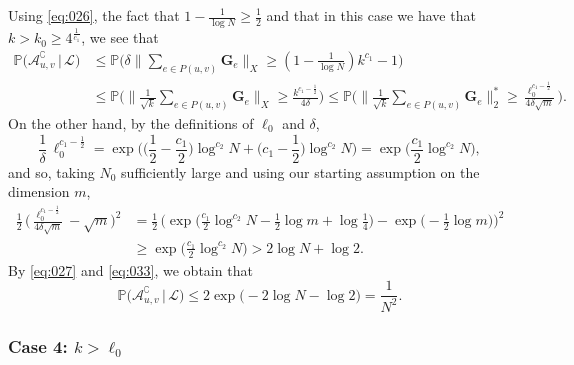 \documentclass[11pt,leqno]{amsart}
\theoremstyle{remark}
\theoremstyle{plain}
\begin{document}
Using \eqref{eq:026}, the fact that $1-\frac{1}{\log N}\geqslant\frac{1}{2}$ and that in this case we have that
$k>k_0\geqslant 4^{\frac{1}{c_1}}$, we see that
\begin{align} \label{eq:033}
\mathbb{P}\big(\mathcal{A}_{u,v}^{\complement}\,\big|\,\mathcal{L}\big) & \leqslant
\mathbb{P}\Bigg(\delta\Big\|\sum_{e\in P(u, v)} \mathbf{G}_e\Big\|_X\geqslant
\left(1-\frac{1}{\log N}\right)k^{c_1}-1\Bigg) \\
& \leqslant \mathbb{P}\Bigg( \Big\|\frac{1}{\sqrt{k}}\sum_{e\in P(u, v)} \mathbf{G}_e\Big\|_X \geqslant
\frac{k^{c_1-\frac{1}{2}}}{4\delta}\Bigg) \leqslant
\mathbb{P}\Bigg( \Big\|\frac{1}{\sqrt{k}}\sum_{e\in P(u, v)} \mathbf{G}_e\Big\|_2^*\geqslant
\frac{\ell_0^{c_1-\frac{1}{2}}}{4\delta\sqrt{m}}\Bigg). \nonumber
\end{align}
On the other hand, by the definitions of $\ell_0$ and $\delta$,
\[  \frac{1}{\delta}\, \ell_0^{c_1-\frac12} =
\exp\Big(\Big(\frac12-\frac{c_1}{2}\Big)\log^{c_2}N +
\Big(c_1-\frac12\Big)\log^{c_2}N\Big)=\exp\Big(\frac{c_1}{2}\log^{c_2}N\Big), \]
and so, taking $N_0$ sufficiently large and using our starting assumption on the dimension $m$,
\begin{align*}
\frac12\, \Big( \frac{\ell_0^{c_1-\frac{1}{2}}}{4\delta\sqrt{m}} - \sqrt{m}\Big)^2
& = \frac12\, \Big( \exp\Big(\frac{c_1}{2}\log^{c_2}N- \frac12\log m +
\log\frac14\Big)- \exp\Big( -\frac12\log m\Big) \Big)^2 \\
&\geqslant \exp\Big( \frac{c_1}{2}\log^{c_2}N\Big) >2\log N+\log2.
\end{align*}
By \eqref{eq:027} and \eqref{eq:033}, we obtain that
\[ \mathbb{P}\big( \mathcal{A}_{u,v}^{\complement}\, \big|\, \mathcal{L}\big)
\leqslant 2\exp\big(-2\log N-\log2\big) = \frac{1}{N^2}. \]

\subsubsection*{Case 4: $k>\ell_0$}
\end{document}
